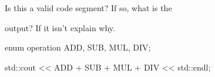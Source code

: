 Is this a valid code segment? If so, what is the

output? If it isn't explain why.



\begin{consolethree}[escapeinside=||]

enum operation {ADD, SUB, MUL, DIV};



std::cout << ADD + SUB + MUL + DIV << std::endl;

\end{consolethree}

